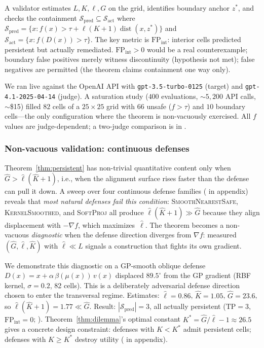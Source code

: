 \documentclass[11pt]{article}
\newcommand{\dist}{\operatorname{dist}}
\begin{document}
A validator estimates $L, K, \ell, G$ on the grid, identifies boundary anchor $z^{*}$, and checks the containment $\mathcal{S}_{\text{pred}} \subseteq \mathcal{S}_{\text{act}}$ where
$\mathcal{S}_{\text{pred}} = \{x : f(x) > \tau + \ell(K{+}1)\dist(x,z^{*})\}$
and $\mathcal{S}_{\text{act}} = \{x : f(D(x)) > \tau\}$.
The key metric is $\mathrm{FP}_{\mathrm{int}}$: interior cells predicted persistent but actually remediated. $\mathrm{FP}_{\mathrm{int}} > 0$ would be a real counterexample; boundary false positives merely witness discontinuity (hypothesis not met); false negatives are permitted (the theorem claims containment one way only).

We ran live against the OpenAI API with \texttt{gpt-3.5-turbo-0125} (target) and \texttt{gpt-4.1-2025-04-14} (judge). A saturation study ($400$ evaluations, ${\sim}5{,}200$ API calls, ${\sim}$\$15) filled $82$ cells of a $25{\times}25$ grid with $66$ unsafe ($f{>}\tau$) and $10$ boundary cells—the only configuration where the theorem is non-vacuously exercised. All $f$ values are judge-dependent; a two-judge comparison is in .

\subsubsection{Non-vacuous validation: continuous defenses}
\label{sec:gp-instance}

Theorem~\ref{thm:persistent} has non-trivial quantitative content only when $\hat G > \hat\ell(\hat K{+}1)$, i.e., when the alignment surface rises faster than the defense can pull it down.
A sweep over four continuous defense families ( in appendix) reveals that \emph{most natural defenses fail this condition}: \textsc{SmoothNearestSafe}, \textsc{KernelSmoothed}, and \textsc{SoftProj} all produce $\hat\ell(\hat K{+}1) \gg \hat G$ because they align displacement with $-\nabla f$, which maximizes~$\hat\ell$.
The theorem becomes a non-vacuous \emph{diagnostic} when the defense direction diverges from $\nabla f$: measured $(\hat G, \hat\ell, \hat K)$ with $\hat\ell \ll L$ signals a construction that fights its own gradient.

We demonstrate this diagnostic on a GP-smooth oblique defense $D(x) = x + \alpha\,\beta(\mu(x))\,v(x)$ displaced $89.5^\circ$ from the GP gradient (RBF kernel, $\sigma{=}0.2$, 82 cells). This is a deliberately adversarial defense direction chosen to enter the transversal regime. Estimates: $\hat\ell = 0.86$, $\hat K = 1.05$, $\hat G = 23.6$, so $\hat\ell(\hat K{+}1) = 1.77 \ll \hat G$. Result: $|\mathcal{S}_{\text{pred}}| = 3$, all actually persistent ($\mathrm{TP}{=}3$, $\mathrm{FP}_{\mathrm{int}}{=}0$; ). Theorem~\ref{thm:dilemma}'s optimal constant $K^* = \hat G/\hat\ell - 1 \approx 26.5$ gives a concrete design constraint: defenses with $K < K^*$ admit persistent cells; defenses with $K \geq K^*$ destroy utility ( in appendix).
\end{document}
